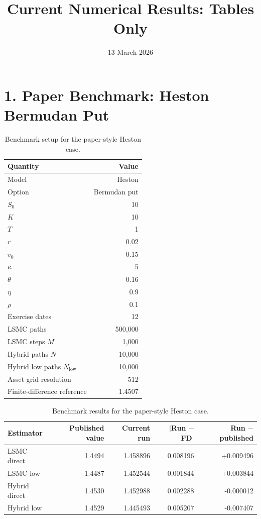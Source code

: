 \documentclass[11pt]{article}
\title{Current Numerical Results: Tables Only}
\date{13 March 2026}
\begin{document}
\maketitle

\section*{1. Paper Benchmark: Heston Bermudan Put}

\begin{table}[ht]
\centering
\caption{Benchmark setup for the paper-style Heston case.}
\begin{tabular}{lr}
\toprule
Quantity & Value \\
\midrule
Model & Heston \\
Option & Bermudan put \\
$S_0$ & 10 \\
$K$ & 10 \\
$T$ & 1 \\
$r$ & 0.02 \\
$v_0$ & 0.15 \\
$\kappa$ & 5 \\
$\theta$ & 0.16 \\
$\eta$ & 0.9 \\
$\rho$ & 0.1 \\
Exercise dates & 12 \\
LSMC paths & 500,000 \\
LSMC steps $M$ & 1,000 \\
Hybrid paths $N$ & 10,000 \\
Hybrid low paths $N_{\mathrm{low}}$ & 10,000 \\
Asset grid resolution & 512 \\
Finite-difference reference & 1.4507 \\
\bottomrule
\end{tabular}
\end{table}

\begin{table}[ht]
\centering
\caption{Benchmark results for the paper-style Heston case.}
\begin{tabular}{lrrrr}
\toprule
Estimator & Published value & Current run & $|$Run $-$ FD$|$ & Run $-$ published \\
\midrule
LSMC direct   & 1.4494 & 1.458896 & 0.008196 & +0.009496 \\
LSMC low      & 1.4487 & 1.452544 & 0.001844 & +0.003844 \\
Hybrid direct & 1.4530 & 1.452988 & 0.002288 & -0.000012 \\
Hybrid low    & 1.4529 & 1.445493 & 0.005207 & -0.007407 \\
\bottomrule
\end{tabular}
\end{table}
\end{document}
